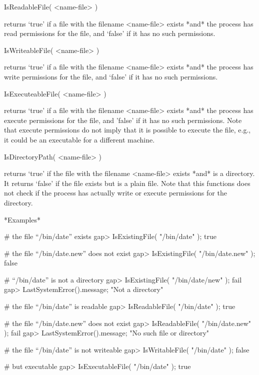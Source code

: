 \>IsReadableFile( <name-file> )

returns `true' if a  file with the  filename <name-file> exists *and* the
{\GAP} process has read  permissions for the  file, and `false' if it has
no such permissions.

\>IsWriteableFile( <name-file> )

returns `true'  if a file with the  filename <name-file> exists *and* the
{\GAP} process has write permissions for the  file, and `false' if it has
no such permissions.

\>IsExecuteableFile( <name-file> )

returns `true' if  a file with the  filename <name-file> exists *and* the
{\GAP} process has execute  permissions for the file,  and 'false' if  it
has no such permissions.  Note that execute permissions do not imply that
it is possible to execute the file, e.g., it could be an executable for a
different machine.

\>IsDirectoryPath( <name-file> )

returns `true' if the file with the  filename <name-file> exists *and* is
a directory.  It returns `false' if the file  exists but is a plain file.
Note  that this  functions does  not  check if   the  {\GAP} process  has
actually write or execute permissions for the directory.

*Examples*

\beginexample
    # the file ``/bin/date'' exists
    gap> IsExistingFile( "/bin/date" );    
    true

    # the file ``/bin/date.new'' does not exist
    gap> IsExistingFile( "/bin/date.new" );
    false

    # ``/bin/date'' is not a directory
    gap> IsExistingFile( "/bin/date/new" );
    fail
    gap> LastSystemError().message;
    "Not a directory"

    # the file ``/bin/date'' is readable
    gap> IsReadableFile( "/bin/date" );
    true

    # the file ``/bin/date.new'' does not exist
    gap> IsReadableFile( "/bin/date.new" );
    fail
    gap> LastSystemError().message;        
    "No such file or directory"

    # the file ``/bin/date'' is not writeable
    gap> IsWritableFile( "/bin/date" );
    false

    # but executable
    gap> IsExecutableFile( "/bin/date" );
    true
\endexample



